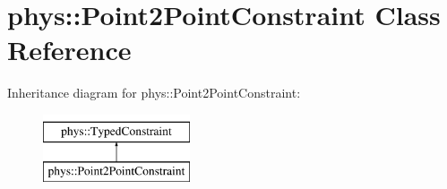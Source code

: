 \hypertarget{classphys_1_1Point2PointConstraint}{
\section{phys::Point2PointConstraint Class Reference}
\label{da/dfb/classphys_1_1Point2PointConstraint}
}
Inheritance diagram for phys::Point2PointConstraint:\begin{figure}[H]
\begin{center}
\leavevmode
\includegraphics[height=2.000000cm]{da/dfb/classphys_1_1Point2PointConstraint}
\end{center}
\end{figure}
